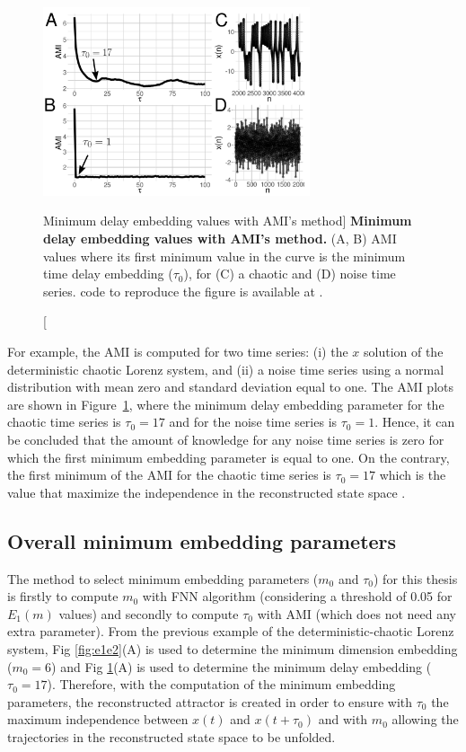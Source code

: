 \begin{figure}[!h]
  \centering
  \includegraphics[width=0.7\textwidth]{fig_3_04}
    \caption
	[Minimum delay embedding values with AMI's method]{
	{\bf Minimum delay embedding values with AMI's method.} 
    	(A, B) AMI values where its first minimum value in the curve
	is the minimum time delay embedding ($\tau_0$), 
	for (C) a chaotic and (D) noise time series.
	\R code to reproduce the figure is available at 
	.
        }
    \label{fig:amis}
\end{figure}
For example, the AMI is computed for two time series:
(i) the $x$ solution of the deterministic chaotic Lorenz system, and 
(ii) a noise time series using a normal distribution with mean zero and 
standard deviation equal to one. The AMI plots are shown in 
Figure~\ref{fig:amis}, where the minimum delay embedding parameter for 
the chaotic time series is $\tau_0=17$ and for the noise time series is  
$\tau_0=1$. Hence, it can be concluded that the amount of knowledge for 
any noise time series is zero for which the first minimum embedding 
parameter is equal to one. On the contrary, the first minimum of the AMI 
for the chaotic time series is $\tau_0=17$ which is the value that maximize 
the independence in the reconstructed state space \citep{bradley2015}.

\subsection{Overall minimum embedding parameters} \label{sec:overall_minMT}
The method to select minimum embedding parameters ($m_0$ and $\tau_0$) 
for this thesis is firstly to compute $m_0$ with FNN algorithm 
(considering a threshold of 0.05 for $E_1(m)$ values) and secondly
to compute $\tau_0$ with AMI (which does not need any extra parameter).
From the previous example of the deterministic-chaotic 
Lorenz system, Fig \ref{fig:e1e2}(A) is used to determine 
the minimum dimension embedding ($m_0 =6$) and 
Fig \ref{fig:amis}(A) is used to determine the minimum delay embedding 
($\tau_0 =17$).
Therefore, with the computation of the minimum embedding parameters, the 
reconstructed attractor is created in order to ensure with $\tau_0$ the 
maximum independence between $x(t)$ and $x(t+\tau_0)$ and with $m_0$ 
allowing the trajectories in the reconstructed state space to be unfolded.


